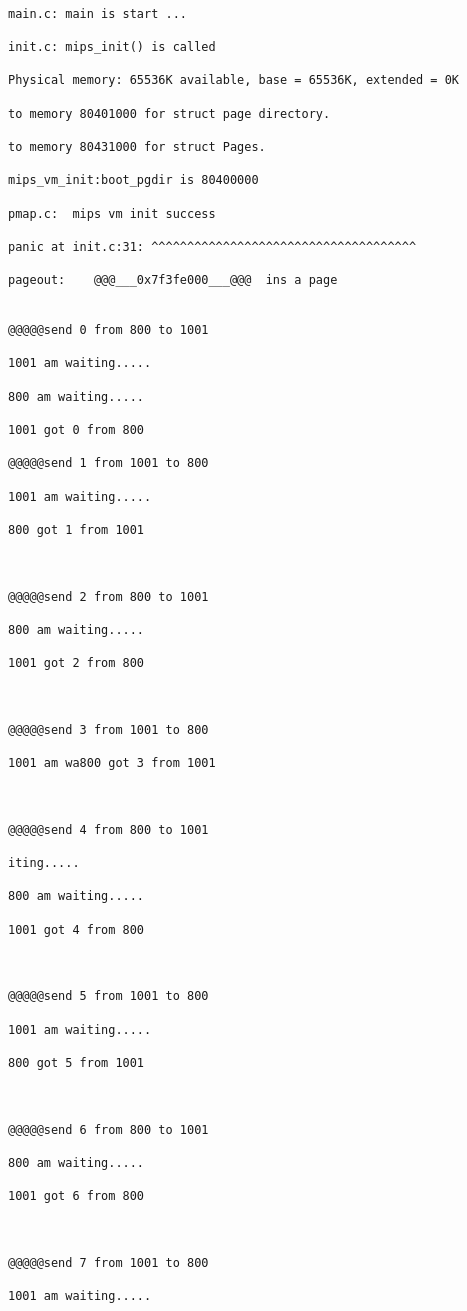 \begin{verbatim}

main.c:	main is start ...

init.c:	mips_init() is called

Physical memory: 65536K available, base = 65536K, extended = 0K

to memory 80401000 for struct page directory.

to memory 80431000 for struct Pages.

mips_vm_init:boot_pgdir is 80400000

pmap.c:	 mips vm init success

panic at init.c:31: ^^^^^^^^^^^^^^^^^^^^^^^^^^^^^^^^^^^^^

pageout:	@@@___0x7f3fe000___@@@  ins a page


@@@@@send 0 from 800 to 1001

1001 am waiting.....

800 am waiting.....

1001 got 0 from 800

@@@@@send 1 from 1001 to 800

1001 am waiting.....

800 got 1 from 1001



@@@@@send 2 from 800 to 1001

800 am waiting.....

1001 got 2 from 800



@@@@@send 3 from 1001 to 800

1001 am wa800 got 3 from 1001



@@@@@send 4 from 800 to 1001

iting.....

800 am waiting.....

1001 got 4 from 800



@@@@@send 5 from 1001 to 800

1001 am waiting.....

800 got 5 from 1001



@@@@@send 6 from 800 to 1001

800 am waiting.....

1001 got 6 from 800



@@@@@send 7 from 1001 to 800

1001 am waiting.....


\end{verbatim}
